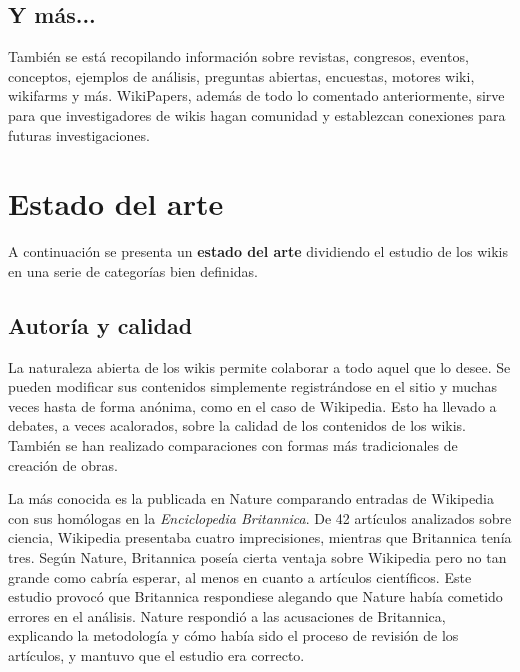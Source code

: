 \documentclass[11pt,onecolumn]{article}
\begin{document}
\subsection{Y más...}
También se está recopilando información sobre revistas, congresos, eventos, conceptos, ejemplos de análisis, preguntas abiertas, encuestas, motores wiki, wikifarms y más. WikiPapers, además de todo lo comentado anteriormente, sirve para que investigadores de wikis hagan comunidad y establezcan conexiones para futuras investigaciones.

\clearpage

\section{Estado del arte}


A continuación se presenta un \textbf{estado del arte} dividiendo el estudio de los wikis en una serie de categorías bien definidas.

\subsection{Autoría y calidad}


La naturaleza abierta de los wikis permite colaborar a todo aquel que lo desee. Se pueden modificar sus contenidos simplemente registrándose en el sitio y muchas veces hasta de forma anónima, como en el caso de Wikipedia. Esto ha llevado a debates, a veces acalorados, sobre la calidad de los contenidos de los wikis. También se han realizado comparaciones con formas más tradicionales de creación de obras.

La más conocida es la publicada en Nature \citep{giles2005} comparando entradas de Wikipedia con sus homólogas en la \emph{Enciclopedia Britannica}. De 42 artículos analizados sobre ciencia, Wikipedia presentaba cuatro imprecisiones, mientras que Britannica tenía tres. Según Nature, Britannica poseía cierta ventaja sobre Wikipedia pero no tan grande como cabría esperar, al menos en cuanto a artículos científicos. Este estudio provocó que Britannica respondiese alegando que Nature había cometido errores en el análisis. Nature respondió a las acusaciones de Britannica, explicando la metodología y cómo había sido el proceso de revisión de los artículos, y mantuvo que el estudio era correcto.
\end{document}
